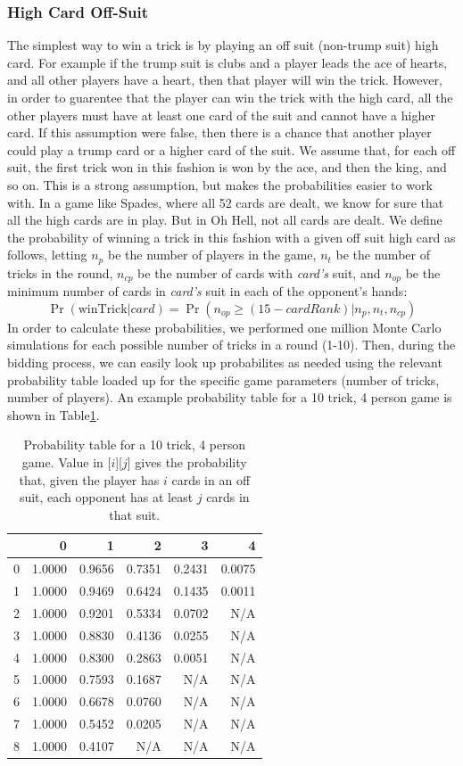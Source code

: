 \documentclass{article}
\begin{document}
\subsubsection{High Card Off-Suit}
\label{subsubsection:highOff}
The simplest way to win a trick is by playing an off suit (non-trump suit) high card. For example if the trump suit is clubs and a player leads the ace of hearts, and all other players have a heart, then that player will win the trick. However, in order to guarentee that the player can win the trick with the high card, all the other players must have at least one card of the suit and cannot have a higher card. 
If this assumption were false, then there is a chance that another player could play a trump card or a higher card of the suit. We assume that, for each off suit, the first trick won in this fashion is won by the ace, and then the king, and so on. This is a strong assumption, but makes the probabilities easier to work with. In a game like Spades, where all 52 cards are dealt, we know for sure that all the high cards are in play. 
But in Oh Hell, not all cards are dealt. We define the probability of winning a trick in this fashion with a given off suit high card as follows, letting $n_p$ be the number of players in the game, $n_t$ be the number of tricks in the round, $n_{cp}$ be the number of cards with \textit{card's} suit, and $n_{op}$ be the minimum number of cards in \textit{card's} suit in each of the opponent's hands:
$$\Pr(\text{winTrick}|\textit{card}) = \Pr(n_{op} \geq (15-\textit{cardRank})|n_p,n_t,n_{cp})$$
In order to calculate these probabilities, we performed one million Monte Carlo simulations for each possible number of tricks in a round (1-10). Then, during the bidding process, we can easily look up probabilites as needed using the relevant probability table loaded up for the specific game parameters (number of tricks, number of players). 
An example probability table for a 10 trick, 4 person game is shown in Table\ref{tab:offSuitProbs}.

\begin{table}
\centering
\caption{Probability table for a 10 trick, 4 person game. Value in [$i$][$j$] gives the probability that, given the player has $i$ cards in an off suit, each opponent has at least $j$ cards in that suit.}
\label{tab:offSuitProbs}
\begin{tabular}{rrrrrr}
 & 0 & 1 & 2 & 3 & 4 \\
\midrule
0 & 1.0000 & 0.9656 & 0.7351 & 0.2431 & 0.0075 \\
1 & 1.0000 & 0.9469 & 0.6424 & 0.1435 & 0.0011 \\
2 & 1.0000 & 0.9201 & 0.5334 & 0.0702 & N/A \\
3 & 1.0000 & 0.8830 & 0.4136 & 0.0255 & N/A \\
4 & 1.0000 & 0.8300 & 0.2863 & 0.0051 & N/A \\
5 & 1.0000 & 0.7593 & 0.1687 & N/A & N/A \\
6 & 1.0000 & 0.6678 & 0.0760 & N/A & N/A \\
7 & 1.0000 & 0.5452 & 0.0205 & N/A & N/A \\
8 & 1.0000 & 0.4107 & N/A & N/A & N/A \\
\bottomrule
\end{tabular}
\end{table}
\end{document}
